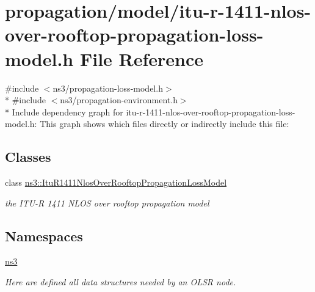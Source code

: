 \hypertarget{itu-r-1411-nlos-over-rooftop-propagation-loss-model_8h}{}\section{propagation/model/itu-\/r-\/1411-\/nlos-\/over-\/rooftop-\/propagation-\/loss-\/model.h File Reference}
\label{itu-r-1411-nlos-over-rooftop-propagation-loss-model_8h}
{\ttfamily \#include $<$ns3/propagation-\/loss-\/model.\+h$>$}\\*
{\ttfamily \#include $<$ns3/propagation-\/environment.\+h$>$}\\*
Include dependency graph for itu-\/r-\/1411-\/nlos-\/over-\/rooftop-\/propagation-\/loss-\/model.h\+:
This graph shows which files directly or indirectly include this file\+:
\subsection*{Classes}
\begin{DoxyCompactItemize}
\item 
class \hyperlink{classns3_1_1ItuR1411NlosOverRooftopPropagationLossModel}{ns3\+::\+Itu\+R1411\+Nlos\+Over\+Rooftop\+Propagation\+Loss\+Model}
\begin{DoxyCompactList}\small\item\em the I\+T\+U-\/R 1411 N\+L\+OS over rooftop propagation model \end{DoxyCompactList}\end{DoxyCompactItemize}
\subsection*{Namespaces}
\begin{DoxyCompactItemize}
\item 
 \hyperlink{namespacens3}{ns3}
\begin{DoxyCompactList}\small\item\em Here are defined all data structures needed by an O\+L\+SR node. \end{DoxyCompactList}\end{DoxyCompactItemize}
